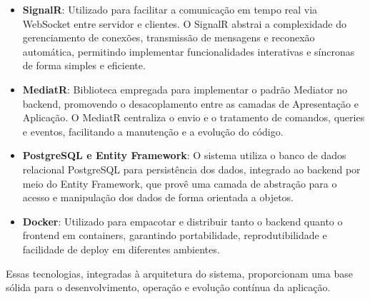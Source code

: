 \begin{itemize}
    \item \textbf{SignalR}: Utilizado para facilitar a comunicação em tempo real via WebSocket entre servidor e clientes. O SignalR abstrai a complexidade do gerenciamento de conexões, transmissão de mensagens e reconexão automática, permitindo implementar funcionalidades interativas e síncronas de forma simples e eficiente.
    \item \textbf{MediatR}: Biblioteca empregada para implementar o padrão Mediator no backend, promovendo o desacoplamento entre as camadas de Apresentação e Aplicação. O MediatR centraliza o envio e o tratamento de comandos, queries e eventos, facilitando a manutenção e a evolução do código.
    \item \textbf{PostgreSQL e Entity Framework}: O sistema utiliza o banco de dados relacional PostgreSQL para persistência dos dados, integrado ao backend por meio do Entity Framework, que provê uma camada de abstração para o acesso e manipulação dos dados de forma orientada a objetos.
    \item \textbf{Docker}: Utilizado para empacotar e distribuir tanto o backend quanto o frontend em containers, garantindo portabilidade, reprodutibilidade e facilidade de deploy em diferentes ambientes.
\end{itemize}

Essas tecnologias, integradas à arquitetura do sistema, proporcionam uma base sólida para o desenvolvimento, operação e evolução contínua da aplicação.

